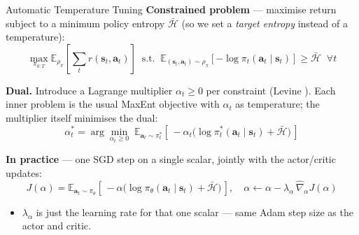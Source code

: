 \begin{frame}{Automatic Temperature Tuning}
\small
\textbf{Constrained problem} --- maximise return subject to a minimum policy entropy $\bar{\mathcal{H}}$ (so we set a \emph{target entropy} instead of a temperature):
\[
\max_{\pi_{0:T}} \mathbb{E}_{\rho_\pi}\!\left[ \sum_{t} r(\mathbf{s}_t, \mathbf{a}_t) \right] \;\; \text{s.t.}\;\; \mathbb{E}_{(\mathbf{s}_t, \mathbf{a}_t) \sim \rho_\pi}\!\left[ -\log \pi_t(\mathbf{a}_t \mid \mathbf{s}_t) \right] \geq \bar{\mathcal{H}}\;\; \forall t
\]

\textbf{Dual.} Introduce a Lagrange multiplier $\alpha_t\!\ge\!0$ per constraint (Levine ). Each inner problem is the usual MaxEnt objective with $\alpha_t$ as temperature; the multiplier itself minimises the dual:
\[
\alpha_t^{*} = \arg\min_{\alpha_t \geq 0}\; \mathbb{E}_{\mathbf{a}_t \sim \pi_t^{*}}\!\left[\, -\alpha_t\big(\log \pi_t^{*}(\mathbf{a}_t \mid \mathbf{s}_t) + \bar{\mathcal{H}}\big) \,\right]
\]

\textbf{In practice} --- one SGD step on a single scalar, jointly with the actor/critic updates:
\[
J(\alpha) = \mathbb{E}_{\mathbf{a}_t \sim \pi_\theta}\!\left[\, -\alpha\big(\log\pi_\theta(\mathbf{a}_t\mid\mathbf{s}_t) + \bar{\mathcal{H}}\big) \,\right],\quad
\alpha \leftarrow \alpha - \lambda_\alpha\,\hat\nabla_\alpha J(\alpha)
\]
\vspace{-0.4em}
\begin{itemize}
    \item[] {\footnotesize $\lambda_\alpha$ is just the learning rate for that one scalar --- same Adam step size as the actor and critic.}
\end{itemize}
\end{frame}

